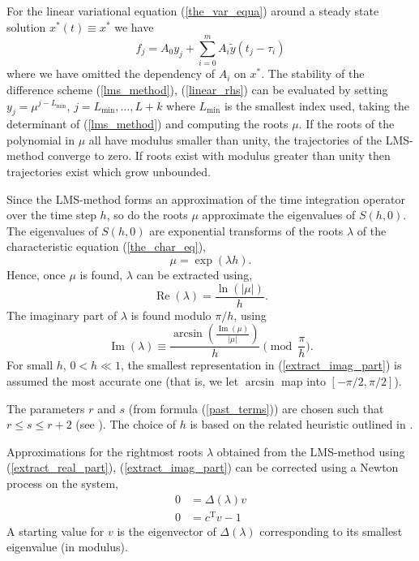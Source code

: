\documentclass[10pt]{scrartcl}
\newcommand{\T}{\mathrm{T}}
\renewcommand{\Re}{\operatorname{Re}}
\renewcommand{\Im}{\operatorname{Im}}
\begin{document}
{For the linear variational equation (\ref{the_var_equa})
around a steady state solution $x^*(t)\equiv x^*$
we have
\begin{equation}\label{linear_rhs}
f_j=A_0y_j+\sum_{i=0}^mA_i\tilde{y}(t_j-\tau_i)
\end{equation}
where we have omitted the dependency of $A_i$ on $x^*$.
The stability of the difference scheme (\ref{lms_method}), (\ref{linear_rhs})
can be evaluated by setting $y_j=\mu^{j-L_{\min}}$, $j=L_{\min},\ldots,L+k$ 
where $L_{\min}$ is the 
smallest index used, taking the determinant of (\ref{lms_method})
and computing the roots $\mu$. If the roots of the
polynomial in $\mu$ all have modulus smaller than unity, the trajectories
of the LMS-method converge to zero. 
If roots exist with modulus greater than unity then trajectories exist
which grow unbounded.

Since the LMS-method forms an approximation of
the time integration operator over the time step $h$, so do the 
roots $\mu$ approximate the eigenvalues of $S(h,0)$.
The eigenvalues of $S(h,0)$ are exponential transforms of
the roots $\lambda$ of the characteristic 
equation (\ref{the_char_eq}),
\[
\mu=\exp(\lambda h).
\]
Hence, once $\mu$ is found, $\lambda$ can be extracted using,
\begin{equation}\label{extract_real_part}
\Re(\lambda)=\frac{\ln(|\mu|)}{h}.
\end{equation}
The imaginary part of $\lambda$ is found modulo $\pi/h$, using
\begin{equation}\label{extract_imag_part}
\Im(\lambda)\equiv\frac{\arcsin(\frac{\Im(\mu)}{|\mu|})}
{h}\!\!\!\!\pmod{\frac{\pi}{h}}.
\end{equation}
For small $h$, $0<h\ll 1$, the smallest representation 
in (\ref{extract_imag_part})
is assumed the most accurate one (that is, we let $\arcsin$
map into $[-\pi/2,\pi/2]$).

The parameters $r$ and $s$ (from formula (\ref{past_terms}))
are chosen such that $r\leq s\leq r+2$ (see \cite{Hong96}).
The choice of $h$ is based on the related 
heuristic outlined in \cite{engel01}.

Approximations for the rightmost roots $\lambda$ obtained
from the LMS-method using (\ref{extract_real_part}), 
(\ref{extract_imag_part}) can be corrected
using a Newton process on the system,
\begin{equation}\label{determ_root}
\begin{aligned}
0&=\Delta(\lambda)v \\
0&=c^\T v-1
\end{aligned}
\end{equation}
A starting value for $v$ is the eigenvector of 
$\Delta(\lambda)$ corresponding to its smallest eigenvalue (in modulus).

}
\end{document}
